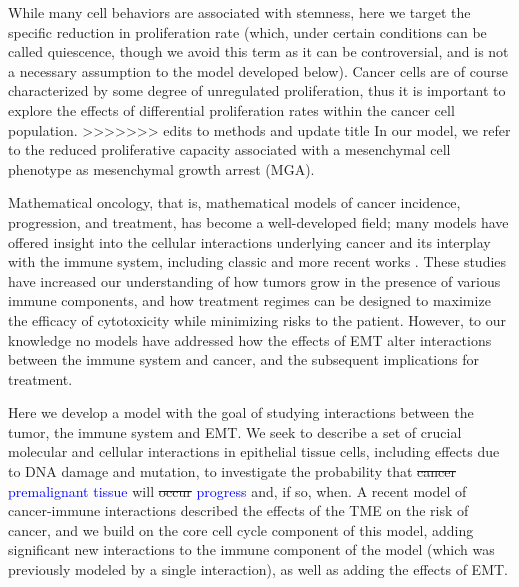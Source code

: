 \documentclass[11pt]{article}
\newcommand{\tcb} { \textcolor{blue} }
\begin{document}
While many cell behaviors are associated with stemness, here we target the specific reduction in proliferation rate \cite{woods2014effects} (which, under certain conditions can be called quiescence, though we avoid this term as it can be controversial, and is not a necessary assumption to the model developed below).
Cancer cells are of course characterized by some degree of unregulated proliferation, thus it is important to explore the effects of differential proliferation rates within the cancer cell population.
>>>>>>> edits to methods and update title
In our model, we refer to the reduced proliferative capacity associated with a mesenchymal cell phenotype as mesenchymal growth arrest (MGA).
\par
Mathematical oncology, that is, mathematical models of cancer incidence, progression, and treatment, has become a well-developed field; many models have offered insight into the cellular interactions underlying cancer and its interplay with the immune system, including classic \cite{anderson98_continuous, sherrattjonathana.92_oncogenes, pillis05_validated} and more recent works \cite{kim18_cell, gallaher14_bridging, gallaher18_spatial, an15_agentbased, serre16_mathematical, louzoun14_mathematical, briones-orta13_arkadia, lavi13_role, greene15_modeling, greene16_mathematical, cho17_modeling-1,  benzekry17_mathematical, owen11_mathematical, west18_multidrug}. These studies have increased our understanding of how tumors grow in the presence of various immune components, and how treatment regimes can be designed to maximize the efficacy of cytotoxicity while minimizing risks to the patient. However, to our knowledge no models have addressed how the effects of EMT alter interactions between the immune system and cancer, and the subsequent implications for treatment. 
\par
Here we develop a model with the goal of studying interactions between the tumor, the immune system and EMT.
We seek to describe a set of crucial molecular and cellular interactions in epithelial tissue cells, including effects due to DNA damage and mutation, to investigate the probability that \sout{cancer} \tcb{premalignant tissue} will \sout{occur} \tcb{progress} and, if so, when.
A recent model of cancer-immune interactions \cite{guo17_multiscale} described the effects of the TME on the risk of cancer, and we build on the core cell cycle component of this model, adding significant new interactions to the immune component of the model (which was previously modeled by a single interaction), as well as adding the effects of EMT.
\end{document}
